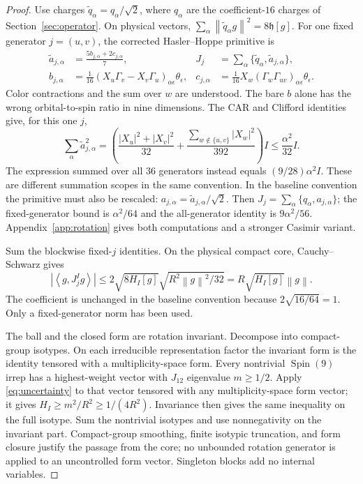 \documentclass[11pt,letterpaper]{article}
\theoremstyle{definition}\newtheorem{hypothesis}[theorem]{Hypothesis}
\newcommand{\hh}{\mathfrak h}
\newcommand{\norm}[1]{\left\lVert #1\right\rVert}
\newcommand{\ip}[2]{\left\langle #1,#2\right\rangle}
\numberwithin{equation}{section}
\begin{document}
\begin{proof}
Use charges $\widetilde q_\alpha=q_\alpha/\sqrt2$, where $q_\alpha$ are the coefficient-$16$ charges of Section~\ref{sec:operator}. On physical vectors,
$\sum_\alpha\norm{\widetilde q_\alpha g}^2=8\hh[g]$.
For one fixed generator $j=(u,v)$, the corrected Hasler--Hoppe primitive is
\begin{align}
 \widetilde a_{j,\alpha}&=\frac{5b_{j,\alpha}+2c_{j,\alpha}}7,
 &J_j&=\sum_\alpha\{\widetilde q_\alpha,\widetilde a_{j,\alpha}\},\label{eq:rotationidentity}\\
 b_{j,\alpha}&=\frac1{16}(X_u\Gamma_v-X_v\Gamma_u)_{\alpha\epsilon}\theta_\epsilon,
 &c_{j,\alpha}&=\frac1{16}X_w(\Gamma_w\Gamma_{uv})_{\alpha\epsilon}\theta_\epsilon.
\end{align}
Color contractions and the sum over $w$ are understood. The bare $b$ alone has the wrong orbital-to-spin ratio in nine dimensions. The CAR and Clifford identities give, for this one $j$,
\begin{equation}
 \sum_\alpha\widetilde a_{j,\alpha}^2
 =\left(\frac{|X_u|^2+|X_v|^2}{32}
       +\frac{\sum_{w\notin\{u,v\}}|X_w|^2}{392}\right)I
 \le\frac{\alpha^2}{32}I.\label{eq:fixedprimitive}
\end{equation}
The expression summed over all $36$ generators instead equals $(9/28)\alpha^2I$. These are different summation scopes in the same convention. In the baseline convention the primitive must also be rescaled: $a_{j,\alpha}=\widetilde a_{j,\alpha}/\sqrt2$. Then $J_j=\sum_\alpha\{q_\alpha,a_{j,\alpha}\}$; the fixed-generator bound is $\alpha^2/64$ and the all-generator identity is $9\alpha^2/56$. Appendix~\ref{app:rotation} gives both computations and a stronger Casimir variant.

Sum the blockwise fixed-$j$ identities. On the physical compact core, Cauchy--Schwarz gives
\begin{equation}
 |\ip{g}{J_j^Ig}|\le
 2\sqrt{8H_I[g]}\sqrt{R^2\norm{g}^2/32}
 =R\sqrt{H_I[g]}\norm{g}.\label{eq:uncertainty}
\end{equation}
The coefficient is unchanged in the baseline convention because $2\sqrt{16/64}=1$. Only a fixed-generator norm has been used.

The ball and the closed form are rotation invariant. Decompose into compact-group isotypes. On each irreducible representation factor the invariant form is the identity tensored with a multiplicity-space form. Every nontrivial $\operatorname{Spin}(9)$ irrep has a highest-weight vector with $J_{12}$ eigenvalue $m\ge1/2$. Apply \eqref{eq:uncertainty} to that vector tensored with any multiplicity-space form vector; it gives $H_I\ge m^2/R^2\ge1/(4R^2)$. Invariance then gives the same inequality on the full isotype. Sum the nontrivial isotypes and use nonnegativity on the invariant part. Compact-group smoothing, finite isotypic truncation, and form closure justify the passage from the core; no unbounded rotation generator is applied to an uncontrolled form vector. Singleton blocks add no internal variables.
\end{proof}
\end{document}
